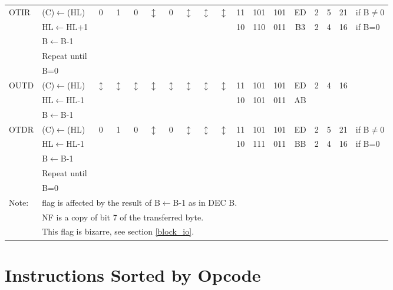 \documentclass[oneside,a4paper]{book}
\begin{document}
{\begin{tabular}{llc@{ }c@{ }c@{ }c@{ }c@{ }c@{ }c@{ }cc@{ }c@{ }cccccll}
OTIR & (C)$\leftarrow$(HL) & 
	0 & 1 & 0 & $\updownarrow$\footnotemark[3] & 0 & $\updownarrow$ & $\updownarrow$\footnotemark[2] & $\updownarrow$\footnotemark[3] & 11 & 101 & 101 
	& ED & 2 & 5 & 21 & \multicolumn{2}{l}{if B$\not=$0} \\
	& HL$\leftarrow$HL+1 & \multicolumn{8}{c}{} & 10 & 110 & 011 & B3 & 2 & 4 & 16 & \multicolumn{2}{l}{if B=0} \\
	& B$\leftarrow$B-1 \\
	& Repeat until \\
	& B=0 \\

OUTD & (C)$\leftarrow$(HL) & 
	$\updownarrow$\footnotemark[1] & $\updownarrow$\footnotemark[1] & $\updownarrow$\footnotemark[1] & $\updownarrow$\footnotemark[3] & 
	$\updownarrow$\footnotemark[1] & $\updownarrow$\footnotemark[3] & $\updownarrow$\footnotemark[2] & $\updownarrow$\footnotemark[3] & 11 & 101 & 101 
	& ED & 2 & 4 & 16 & & \\
	& HL$\leftarrow$HL-1 & \multicolumn{8}{c}{} & 10 & 101 & 011 & AB & & &  & & \\
	& B$\leftarrow$B-1 \\

OTDR & (C)$\leftarrow$(HL) & 
	0 & 1 & 0 & $\updownarrow$\footnotemark[3] & 0 & $\updownarrow$\footnotemark[3] & $\updownarrow$\footnotemark[2] & $\updownarrow$\footnotemark[5] & 11 & 101 & 101 
	& ED & 2 & 5 & 21 & \multicolumn{2}{l}{if B$\not=$0} \\
	& HL$\leftarrow$HL-1 & \multicolumn{8}{c}{} & 10 & 111 & 011 & BB & 2 & 4 & 16 & \multicolumn{2}{l}{if B=0} \\
	& B$\leftarrow$B-1 \\
	& Repeat until \\
	& B=0 \\ \hline

Note: & \multicolumn{18}{l}{\parbox{12cm}{\footnotemark[1] flag is affected by the result of B$\leftarrow$B-1 as in DEC B.}} \\
      & \multicolumn{18}{l}{\parbox{12cm}{\footnotemark[2] NF is a copy of bit 7 of the transferred byte.}} \\
      & \multicolumn{18}{l}{\parbox{12cm}{\footnotemark[3] This flag is bizarre, see section \ref{block_io}.}} \\ \hline

\end{tabular}
}

\chapter{Instructions Sorted by Opcode}
\end{document}
